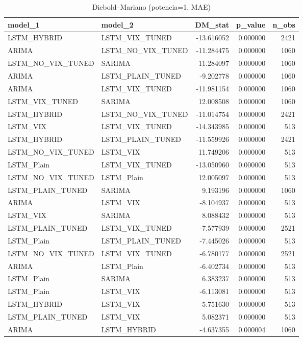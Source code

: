\begin{table}
\caption{Diebold–Mariano (potencia=1, MAE)}
\label{dm_mae}
\begin{tabular}{llrrr}
\toprule
model_1 & model_2 & DM_stat & p_value & n_obs \\
\midrule
LSTM_HYBRID & LSTM_VIX_TUNED & -13.616052 & 0.000000 & 2421 \\
ARIMA & LSTM_NO_VIX_TUNED & -11.284475 & 0.000000 & 1060 \\
LSTM_NO_VIX_TUNED & SARIMA & 11.284097 & 0.000000 & 1060 \\
ARIMA & LSTM_PLAIN_TUNED & -9.202778 & 0.000000 & 1060 \\
ARIMA & LSTM_VIX_TUNED & -11.981154 & 0.000000 & 1060 \\
LSTM_VIX_TUNED & SARIMA & 12.008508 & 0.000000 & 1060 \\
LSTM_HYBRID & LSTM_NO_VIX_TUNED & -11.014754 & 0.000000 & 2421 \\
LSTM_VIX & LSTM_VIX_TUNED & -14.343985 & 0.000000 & 513 \\
LSTM_HYBRID & LSTM_PLAIN_TUNED & -11.559926 & 0.000000 & 2421 \\
LSTM_NO_VIX_TUNED & LSTM_VIX & 11.749206 & 0.000000 & 513 \\
LSTM_Plain & LSTM_VIX_TUNED & -13.050960 & 0.000000 & 513 \\
LSTM_NO_VIX_TUNED & LSTM_Plain & 12.005097 & 0.000000 & 513 \\
LSTM_PLAIN_TUNED & SARIMA & 9.193196 & 0.000000 & 1060 \\
ARIMA & LSTM_VIX & -8.104937 & 0.000000 & 513 \\
LSTM_VIX & SARIMA & 8.088432 & 0.000000 & 513 \\
LSTM_PLAIN_TUNED & LSTM_VIX_TUNED & -7.577939 & 0.000000 & 2521 \\
LSTM_Plain & LSTM_PLAIN_TUNED & -7.445026 & 0.000000 & 513 \\
LSTM_NO_VIX_TUNED & LSTM_VIX_TUNED & -6.780177 & 0.000000 & 2521 \\
ARIMA & LSTM_Plain & -6.402734 & 0.000000 & 513 \\
LSTM_Plain & SARIMA & 6.383237 & 0.000000 & 513 \\
LSTM_Plain & LSTM_VIX & -6.113081 & 0.000000 & 513 \\
LSTM_HYBRID & LSTM_VIX & -5.751630 & 0.000000 & 513 \\
LSTM_PLAIN_TUNED & LSTM_VIX & 5.082371 & 0.000000 & 513 \\
ARIMA & LSTM_HYBRID & -4.637355 & 0.000004 & 1060 \\

\end{tabular}
\end{table}
